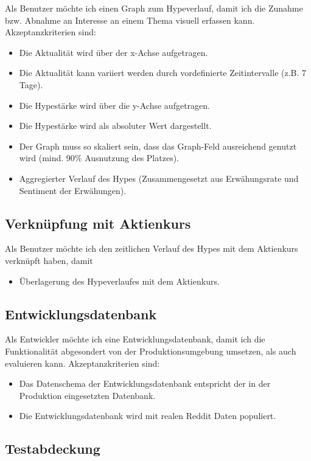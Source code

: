 \documentclass[a4paper, 10pt, conference]{ieeeconf}
\begin{document}
Als Benutzer möchte ich einen Graph zum Hypeverlauf, damit ich die Zunahme bzw. Abnahme an Interesse an einem Thema visuell erfassen kann. Akzeptanzkriterien sind:
\begin{itemize}
\item Die Aktualität wird über der x-Achse aufgetragen.
\item Die Aktualität kann variiert werden durch vordefinierte Zeitintervalle (z.B. 7 Tage).
\item Die Hypestärke wird über die y-Achse aufgetragen.
\item Die Hypestärke wird als absoluter Wert dargestellt.
\item Der Graph muss so skaliert sein, dass das Graph-Feld ausreichend genutzt wird (mind. 90\% Ausnutzung des Platzes).
\item Aggregierter Verlauf des Hypes (Zusammengesetzt aus Erwähungsrate und Sentiment der Erwähungen).
\end{itemize}

\subsection{Verknüpfung mit Aktienkurs}

Als Benutzer möchte ich den zeitlichen Verlauf des Hypes mit dem Aktienkurs verknüpft haben, damit 
\begin{itemize}
\item Überlagerung des Hypeverlaufes mit dem Aktienkurs.
\end{itemize}

\subsection{Entwicklungsdatenbank}

Als Entwickler möchte ich eine Entwicklungsdatenbank, damit ich die Funktionalität abgesondert von der Produktionsumgebung umsetzen, als auch evaluieren kann.  Akzeptanzkriterien sind:
\begin{itemize}
\item Das Datenschema der Entwicklungsdatenbank entspricht der in der Produktion eingesetzten Datenbank.
\item Die Entwicklungsdatenbank wird mit realen Reddit Daten populiert.
\end{itemize}

\subsection{Testabdeckung}
\end{document}
